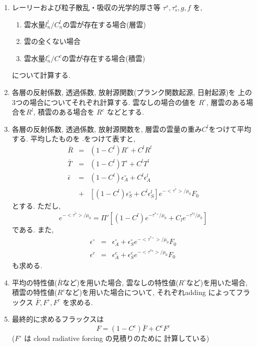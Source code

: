 \begin{enumerate}
\item レーリーおよび粒子散乱・吸収の光学的厚さ等
      $\tau^s, \tau_s^s, g, f$ を,
      \begin{enumerate}
      \item 雲水量$l^l_n/C^l_n$の雲が存在する場合(層雲)
      \item 雲の全くない場合
      \item 雲水量$l^c_n/C^c$の雲が存在する場合(積雲)
      \end{enumerate}
      について計算する.

\item 各層の反射係数, 透過係数, 
      放射源関数(プランク関数起源, 日射起源)を
      上の3つの場合についてそれぞれ計算する.
      雲なしの場合の値を
      $R^\circ$, 層雲のある場合を$R^l$, 積雲のある場合を
      $R^c$ などとする.

\item 各層の反射係数, 透過係数, 
      放射源関数を, 層雲の雲量の重み$C^l$をつけて平均する.
      平均したものを $\bar{}$をつけて表すと,
      \begin{eqnarray}
        \bar{R} & = & ( 1 - C^l ) R^\circ + C^l R^l \\
        \bar{T} & = & ( 1 - C^l ) T^\circ + C^l T^l \\
        \bar{\epsilon} & = & 
            ( 1 - C^l ) \epsilon_A^\circ + C^l \epsilon_A^l \\        
          & + & 
            \left[ ( 1 - C^l ) \epsilon_S^\circ + C^l \epsilon_S^l \right] 
            e^{-\overline{<\tau^*>}/\mu_0} F_0 
      \end{eqnarray}
      とする. ただし,
      \begin{equation}
        e^{-\overline{<\tau^*>}/\mu_0} 
        = \Pi' \left[ ( 1 - C^l ) e^{-\tau^{*\circ}/\mu_0} 
                       + C_l e^{-\tau^{*l}/\mu_0} \right]
      \end{equation}
      である. 
      また,
      \begin{eqnarray}
        \epsilon^\circ & = & \epsilon_A^\circ +
                             \epsilon_S^\circ 
                              e^{-<\tau^{*\circ}>/\mu_0} F_0 \\
        \epsilon^c     & = & \epsilon_A^c +
                             \epsilon_S^c 
                              e^{-<\tau^{*c}>/\mu_0} F_0        
      \end{eqnarray}
      も求める.

\item 平均の特性値($\bar{R}$など)を用いた場合,
      雲なしの特性値($R^\circ$など)を用いた場合,
      積雲の特性値($R^c$など)を用いた場合について,
      それぞれadding によってフラックス
      $\bar{F}, F^\circ, F^c$ を求める.
      
\item 最終的に求めるフラックスは
      \begin{equation}
        F = ( 1 - C^c ) \bar{F} + C^c F^c
      \end{equation}
      ($F^\circ$ は cloud radiative forcing の見積りのために
       計算している)

\end{enumerate}

